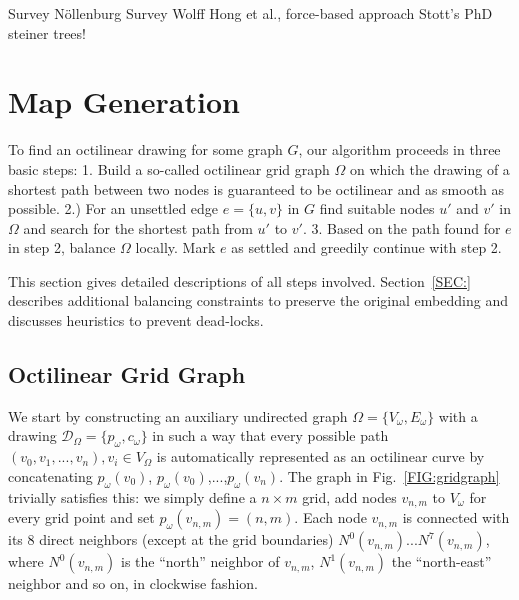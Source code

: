 \documentclass{sig-alternate-sigmod09}
\begin{document}
Survey Nöllenburg %
Survey Wolff %
Hong et al., force-based approach
Stott's PhD
steiner trees! %

\section{Map Generation}

To find an octilinear drawing for some graph $G$, our algorithm proceeds in three basic steps: 1. Build a so-called octilinear grid graph $\Omega$ on which the drawing of a shortest path between two nodes is guaranteed to be octilinear and as smooth as possible. 2.) For an unsettled edge $e = \{u, v\}$ in $G$ find suitable nodes $u'$ and $v'$ in $\Omega$ and search for the shortest path from $u'$ to $v'$. 3. Based on the path found for $e$ in step 2, balance $\Omega$ locally. Mark $e$ as settled and greedily continue with step 2.

This section gives detailed descriptions of all steps involved. Section~\ref{SEC:} describes additional balancing constraints to preserve the original embedding and discusses heuristics to prevent dead-locks.

\subsection{Octilinear Grid Graph}

We start by constructing an auxiliary undirected graph $\Omega = \{V_\omega, E_\omega\}$ with a drawing $\mathcal{D}_\Omega = \{p_\omega, c_\omega\}$ in such a way that every possible path $(v_0, v_1, ..., v_n), v_i \in V_\Omega$ is automatically represented as an octilinear curve by concatenating $p_\omega(v_0)$, $p_\omega(v_0)$,$...$,$p_\omega(v_n)$. The graph in Fig.~\ref{FIG:gridgraph} trivially satisfies this: we simply define a $n\times m$ grid, add nodes $v_{n,m}$ to $V_\omega$ for every grid point and set $p_\omega(v_{n,m}) = (n, m)$. Each node $v_{n,m}$ is connected with its 8 direct neighbors (except at the grid boundaries) $N^0(v_{n,m}) ... N^7(v_{n, m})$, where $N^0(v_{n,m})$ is the ``north'' neighbor of $v_{n, m}$,  $N^1(v_{n,m})$ the ``north-east'' neighbor and so on, in clockwise fashion.
\end{document}
